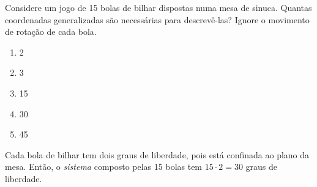 \begin{question}
    Considere um jogo de 15 bolas de bilhar dispostas numa mesa de sinuca.
    Quantas coordenadas generalizadas são necessárias para descrevê-las?
    Ignore o movimento de rotação de cada bola.
    \begin{enumerate}
      \item 2
      \item 3
      \item 15
      \item 30 \rightanswer
      \item 45
    \end{enumerate}

    \begin{solution}
      Cada bola de bilhar tem dois graus de liberdade, pois está confinada ao plano da mesa.
      Então, o \emph{sistema} composto pelas 15 bolas tem $15\cdot 2 = 30$ graus de liberdade.
    \end{solution}
\end{question}